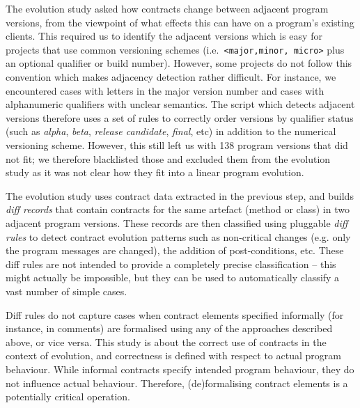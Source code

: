 \documentclass[a4paper,UKenglish]{lipics-v2016}
\begin{document}
The evolution study asked how contracts change between adjacent program versions, from the viewpoint of what effects this can have on a program's existing clients. This required us to identify the adjacent versions which is easy for projects that use common versioning schemes (i.e.\ \texttt{<major,minor, micro>} plus an optional qualifier or build number). However, some projects do not follow this convention which makes adjacency detection rather difficult. For instance, we encountered cases with letters in the major version number and cases with alphanumeric qualifiers with unclear semantics. The script which detects adjacent versions therefore uses a set of rules to correctly order versions by qualifier status (such as \textit{alpha}, \textit{beta}, \textit{release candidate}, \textit{final}, etc) in addition to the numerical versioning scheme. However, this still left us with 138 program versions that did not fit; we therefore blacklisted those and excluded them from the evolution study as it was not clear how they fit into a linear program evolution.

The evolution study uses contract data extracted in the previous step, and builds \textit{diff records} that contain contracts for the same artefact (method or class) in two adjacent program versions. These records are then classified using pluggable \textit{diff rules} to detect contract evolution patterns such as non-critical changes (e.g. only the program messages are changed), the addition of post-conditions, etc. These diff rules are not intended to provide a completely precise classification -- this might actually be impossible, but they can be used to automatically classify a vast number of simple cases.  

Diff rules do not capture cases when contract elements specified informally (for instance, in comments) are formalised using any of the approaches described above, or vice versa. This study is about the correct use of contracts in the context of evolution, and correctness is defined with respect to actual program behaviour. While informal contracts specify intended program behaviour, they do not influence actual behaviour. Therefore, (de)formalising contract elements is a potentially critical operation.  
\end{document}
